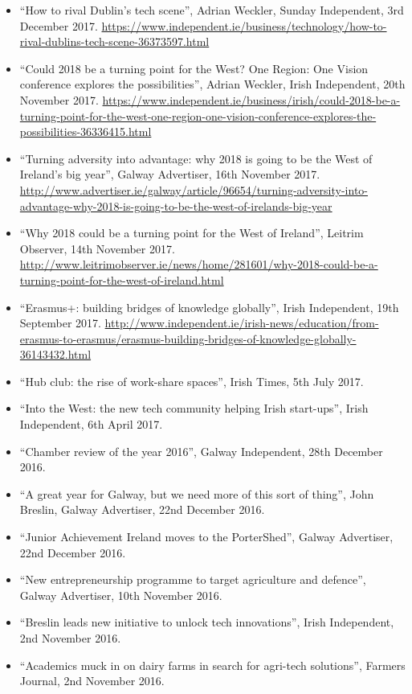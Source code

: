 \documentclass[10pt,a4paper]{res} %
\begin{document}
\begin{resume}
{\begin{itemize}
\item ``How to rival Dublin's tech scene'', Adrian Weckler, Sunday Independent, 3rd December 2017. \url{https://www.independent.ie/business/technology/how-to-rival-dublins-tech-scene-36373597.html}
\item ``Could 2018 be a turning point for the West? One Region: One Vision conference explores the possibilities'', Adrian Weckler, Irish Independent, 20th November 2017. \url{https://www.independent.ie/business/irish/could-2018-be-a-turning-point-for-the-west-one-region-one-vision-conference-explores-the-possibilities-36336415.html}
\item ``Turning adversity into advantage: why 2018 is going to be the West of Ireland's big year'', Galway Advertiser, 16th November 2017. \url{http://www.advertiser.ie/galway/article/96654/turning-adversity-into-advantage-why-2018-is-going-to-be-the-west-of-irelands-big-year}
\item ``Why 2018 could be a turning point for the West of Ireland'', Leitrim Observer, 14th November 2017. \url{http://www.leitrimobserver.ie/news/home/281601/why-2018-could-be-a-turning-point-for-the-west-of-ireland.html}
\item ``Erasmus+: building bridges of knowledge globally'', Irish Independent, 19th September 2017. \url{http://www.independent.ie/irish-news/education/from-erasmus-to-erasmus/erasmus-building-bridges-of-knowledge-globally-36143432.html}
\item ``Hub club: the rise of work-share spaces'', Irish Times, 5th July 2017.
\item ``Into the West: the new tech community helping Irish start-ups'', Irish Independent, 6th April 2017.
\item ``Chamber review of the year 2016'', Galway Independent, 28th December 2016.
\item ``A great year for Galway, but we need more of this sort of thing'', John Breslin, Galway Advertiser, 22nd December 2016.
\item ``Junior Achievement Ireland moves to the PorterShed'', Galway Advertiser, 22nd December 2016.
\item ``New entrepreneurship programme to target agriculture and defence'', Galway Advertiser, 10th November 2016.
\item ``Breslin leads new initiative to unlock tech innovations'', Irish Independent, 2nd November 2016.
\item ``Academics muck in on dairy farms in search for agri-tech solutions'', Farmers Journal, 2nd November 2016.

\end{itemize}}
\end{resume}
\end{document}
